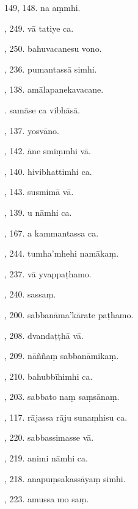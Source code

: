 149, 148. na aṃmhi.\hfill \pageref{sut:149}\par {}, 249. vā tatiye ca.\hfill \pageref{sut:150}\par {}, 250. bahuvacanesu vono.\hfill \pageref{sut:151}\par {}, 236. pumantassā simhi.\hfill \pageref{sut:152}\par {}, 138. amālapanekavacane.\hfill \pageref{sut:153}\par {}. samāse ca vibhāsā.\hfill \pageref{sut:154}\par {}, 137. yosvāno.\hfill \pageref{sut:155}\par {}, 142. āne smiṃmhi vā.\hfill \pageref{sut:156}\par {}, 140. hivibhattimhi ca.\hfill \pageref{sut:157}\par {}, 143. susmimā vā.\hfill \pageref{sut:158}\par {}, 139. u nāmhi ca.\hfill \pageref{sut:159}\par {}, 167. a kammantassa ca.\hfill \pageref{sut:160}\par {}, 244. tumha’mhehi namākaṃ.\hfill \pageref{sut:161}\par {}, 237. vā yvappaṭhamo.\hfill \pageref{sut:162}\par {}, 240. sassaṃ.\hfill \pageref{sut:163}\par {}, 200. sabbanāma’kārate paṭhamo.\hfill \pageref{sut:164}\par {}, 208. dvandaṭṭhā vā.\hfill \pageref{sut:165}\par {}, 209. nāññaṃ sabbanāmikaṃ.\hfill \pageref{sut:166}\par {}, 210. bahubbīhimhi ca.\hfill \pageref{sut:167}\par {}, 203. sabbato naṃ saṃsānaṃ.\hfill \pageref{sut:168}\par {}, 117. rājassa rāju sunaṃhisu ca.\hfill \pageref{sut:169}\par {}, 220. sabbassimasse vā.\hfill \pageref{sut:170}\par {}, 219. animi nāmhi ca.\hfill \pageref{sut:171}\par {}, 218. anapuṃsakassāyaṃ simhi.\hfill \pageref{sut:172}\par {}, 223. amussa mo saṃ.\hfill \pageref{sut:173}\par \noindent
